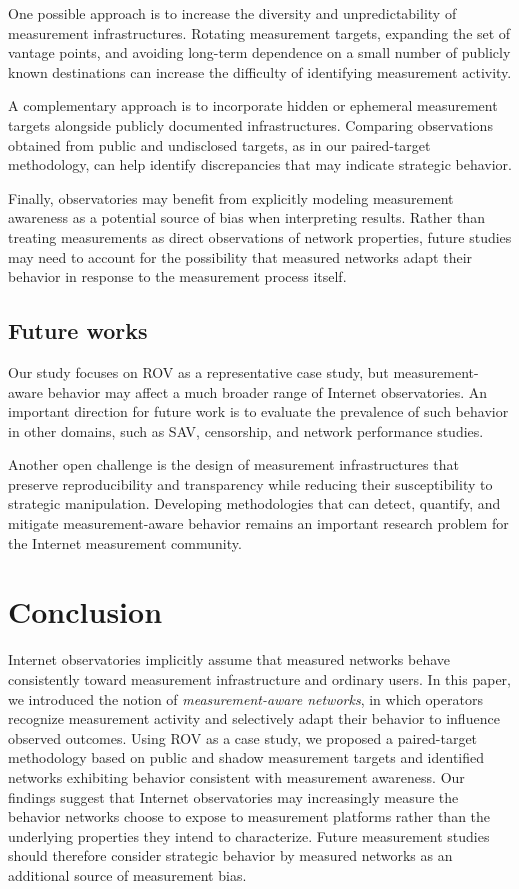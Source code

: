\documentclass[sigconf, 10pt, anonymous, nonacm]{acmart}
\begin{document}
One possible approach is to increase the diversity and unpredictability of measurement infrastructures. Rotating measurement targets, expanding the set of vantage points, and avoiding long-term dependence on a small number of publicly known destinations can increase the difficulty of identifying measurement activity.

A complementary approach is to incorporate hidden or ephemeral measurement targets alongside publicly documented infrastructures. Comparing observations obtained from public and undisclosed targets, as in our paired-target methodology, can help identify discrepancies that may indicate strategic behavior.

Finally, observatories may benefit from explicitly modeling measurement awareness as a potential source of bias when interpreting results. Rather than treating measurements as direct observations of network properties, future studies may need to account for the possibility that measured networks adapt their behavior in response to the measurement process itself.

\subsection{Future works}

Our study focuses on ROV as a representative case study, but measurement-aware behavior may affect a much broader range of Internet observatories. An important direction for future work is to evaluate the prevalence of such behavior in other domains, such as SAV, censorship, and network performance studies.

Another open challenge is the design of measurement infrastructures that preserve reproducibility and transparency while reducing their susceptibility to strategic manipulation. Developing methodologies that can detect, quantify, and mitigate measurement-aware behavior remains an important research problem for the Internet measurement community.

\section{Conclusion}

Internet observatories implicitly assume that measured networks behave consistently toward measurement infrastructure and ordinary users. In this paper, we introduced the notion of \emph{measurement-aware networks}, in which operators recognize measurement activity and selectively adapt their behavior to influence observed outcomes. Using ROV as a case study, we proposed a paired-target methodology based on public and shadow measurement targets and identified networks exhibiting behavior consistent with measurement awareness. Our findings suggest that Internet observatories may increasingly measure the behavior networks choose to expose to measurement platforms rather than the underlying properties they intend to characterize. Future measurement studies should therefore consider strategic behavior by measured networks as an additional source of measurement bias.



\end{document}
